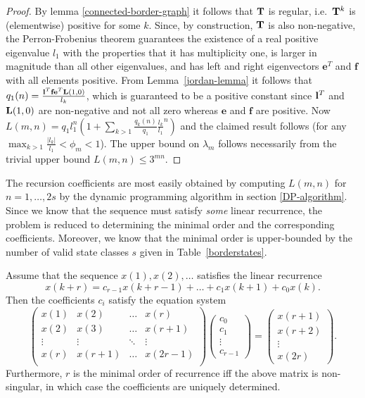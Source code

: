 \documentclass{article}
\begin{document}
\begin{proof}
By lemma \ref{connected-border-graph} it
follows that $\mathbf{T}$ is regular, i.e.\ $\mathbf{T}^k$ is (elementwise)
positive for some $k$. Since, by construction, $\mathbf{T}$ is also
non-negative, the Perron-Frobenius theorem guarantees the existence of a
real positive eigenvalue $l_1$ with the properties that it has
multiplicity one, is larger in magnitude than all other eigenvalues,
and has left and right eigenvectors $\mathbf{e}^T$ and $\mathbf{f}$
with all elements positive. From Lemma~\ref{jordan-lemma} it follows
that $q_1(n) = \frac{\mathbf{l}^T \mathbf{f} \mathbf{e}^T \mathbf{L}(1,0)}{l_k}$,
which is guaranteed to be a positive constant since $\mathbf{l}^T$ and
$\mathbf{L}(1,0)$ are non-negative and not all zero whereas $\mathbf{e}$ and
$\mathbf{f}$ are positive. Now $L(m,n) = q_1 l_1^n (1 + \sum_{k>1}
\frac{q_k(n)}{q_1} \frac{l_k}{l_1}^n)$ and the claimed result follows
(for any $\max_{k>1} \frac{|l_k|}{l_1}<\phi_m<1$). The upper bound on
$\lambda_m$ follows necessarily from the trivial upper bound
$L(m,n) \leq 3^{mn}$.
\end{proof}

The recursion coefficients are most easily obtained by
computing $L(m,n)$ for $n=1,\dots,2s$
by the dynamic programming algorithm in section
\ref{DP-algorithm}. Since we know that the sequence must satisfy
\emph{some} linear recurrence, the problem is reduced to determining the
minimal order and the corresponding coefficients. Moreover, we know
that the minimal order is upper-bounded by the number of valid state
classes $s$ given in Table~\ref{borderstates}.

\begin{lemma}
\label{coefficient-lemma}
  Assume that the sequence $x(1), x(2), \dots$ satisfies the linear
  recurrence
  \[
    x(k+r) = c_{r-1} x(k+r-1) + \dots + c_1 x(k+1) + c_0 x(k).
  \]
  Then the coefficients $c_i$ satisfy the equation system
  \[
    \begin{pmatrix}
      x(1) & x(2) & \dots & x(r) \\
      x(2) & x(3) & \dots & x(r+1) \\
      \vdots & \vdots & \ddots & \vdots \\
      x(r) & x(r+1) & \dots & x(2r-1) \\
    \end{pmatrix}
    \begin{pmatrix}
      c_0 \\ c_1 \\ \vdots \\ c_{r-1}
    \end{pmatrix} = 
    \begin{pmatrix}
      x(r+1) \\ x(r+2) \\ \vdots \\ x(2r)
    \end{pmatrix}.
  \]
  Furthermore, $r$ is the minimal order of recurrence iff
  the above matrix is non-singular, in which case the coefficients
  are uniquely determined.
\end{lemma}
\end{document}
